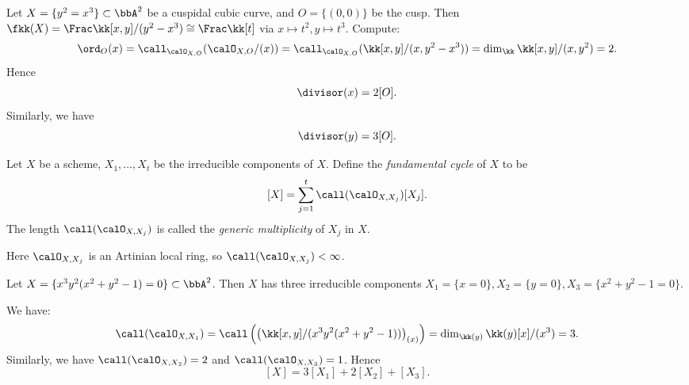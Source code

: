     \begin{example}
        Let \(X = \{y^2 = x^3\} \subset \bbA^2\) be a cuspidal cubic curve, and \(O = \{(0,0)\}\) be the cusp.
        Then \(\fkk(X) = \Frac \kk[x,y]/(y^2-x^3) \cong \Frac \kk[t]\) via \(x \mapsto t^2, y \mapsto t^3\).
        Compute:
        \[ \ord_O(x) = \call_{\calO_{X,O}}(\calO_{X,O}/(x)) = \call_{\calO_{X,O}}(\kk[x,y]/(x,y^2-x^3)) = \dim_\kk \kk[x,y]/(x,y^2) = 2. \]
        Hence 
        \[ \divisor(x) = 2[O]. \]
        Similarly, we have 
        \[ \divisor(y) = 3[O]. \]
    \end{example}

    \begin{definition}
        Let \(X\) be a scheme, \(X_1, \ldots, X_t\) be the irreducible components of \(X\).
        Define the \emph{fundamental cycle} of \(X\) to be
        \[ [X] = \sum_{j=1}^t \call(\calO_{X,X_j}) [X_j]. \]
        The length \(\call(\calO_{X,X_j})\) is called the \emph{generic multiplicity} of \(X_j\) in \(X\).
    \end{definition}

    Here \(\calO_{X,X_j}\) is an Artinian local ring, so \(\call(\calO_{X,X_j}) < \infty\).

    \begin{example}
        Let \(X = \{x^3y^2(x^2+y^2-1) = 0\} \subset \bbA^2\).
        Then \(X\) has three irreducible components \(X_1 = \{x=0\}, X_2 = \{y=0\}, X_3 = \{x^2+y^2-1=0\}\).
        \begin{center}
        \end{center}
        We have:
        \[ \call(\calO_{X,X_1}) = \call\left(\left(\kk[x,y]/(x^3y^2(x^2+y^2-1))\right)_{(x)}\right) = \dim_{\kk(y)} \kk(y)[x]/(x^3) = 3. \]
        Similarly, we have \(\call(\calO_{X,X_2}) = 2\) and \(\call(\calO_{X,X_3}) = 1\).
        Hence
        \[ [X] = 3[X_1] + 2[X_2] + [X_3]. \]
    \end{example}

